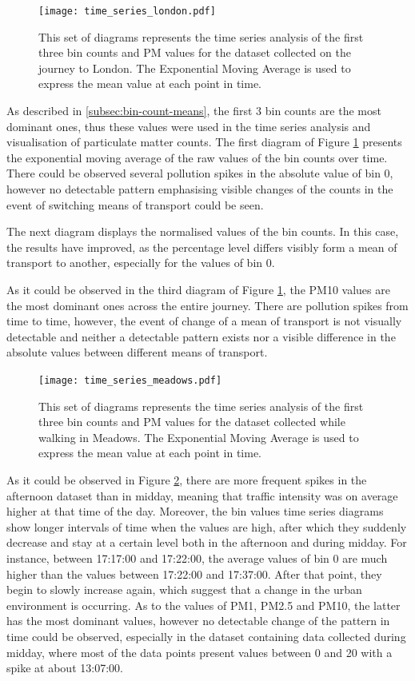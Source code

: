 \documentclass[bsc,frontabs,twoside,singlespacing,parskip,deptreport]{infthesis}     %
\begin{document}
\begin{figure}[h!]
  \center
  \texttt{[image: time\_series\_london.pdf]} 
  \caption{This set of diagrams represents the time series analysis of the first three bin counts and PM values for the dataset collected on the journey to London. The Exponential Moving Average is used to express the mean value at each point in time.}
  \label{fig:time_series_london}
\end{figure}

As described in \ref{subsec:bin-count-means}, the first 3 bin counts are the most dominant ones, thus these values were used in the time series analysis and visualisation of particulate matter counts. The first diagram of Figure \ref{fig:time_series_london} presents the exponential moving average of the raw values of the bin counts over time. There could be observed several pollution spikes in the absolute value of bin 0, however no detectable pattern emphasising visible changes of the counts in the event of switching means of transport could be seen.

The next diagram displays the normalised values of the bin counts. In this case, the results have improved, as the percentage level differs visibly form a mean of transport to another, especially for the values of bin 0.

As it could be observed in the third diagram of Figure \ref{fig:time_series_london}, the PM10 values are the most dominant ones across the entire journey. There are pollution spikes from time to time, however, the event of change of a mean of transport is not visually detectable and neither a detectable pattern exists nor a visible difference in the absolute values between different means of transport.

\begin{figure}[h!]
  \center
  \texttt{[image: time\_series\_meadows.pdf]} 
  \caption{This set of diagrams represents the time series analysis of the first three bin counts and PM values for the dataset collected while walking in Meadows. The Exponential Moving Average is used to express the mean value at each point in time.}
  \label{fig:time_series_meadows}
\end{figure}

As it could be observed in Figure \ref{fig:time_series_meadows}, there are more frequent spikes in the afternoon dataset than in midday, meaning that traffic intensity was on average higher at that time of the day. Moreover, the bin values time series diagrams show longer intervals of time when the values are high, after which they suddenly decrease and stay at a certain level both in the afternoon and during midday. For instance, between 17:17:00 and 17:22:00, the average values of bin 0 are much higher than the values between 17:22:00 and 17:37:00. After that point, they begin to slowly increase again, which suggest that a change in the urban environment is occurring. As to the values of PM1, PM2.5 and PM10, the latter has the most dominant values, however no detectable change of the pattern in time could be observed, especially in the dataset containing data collected during midday, where most of the data points present values between 0 and 20 with a spike at about 13:07:00.
\end{document}
